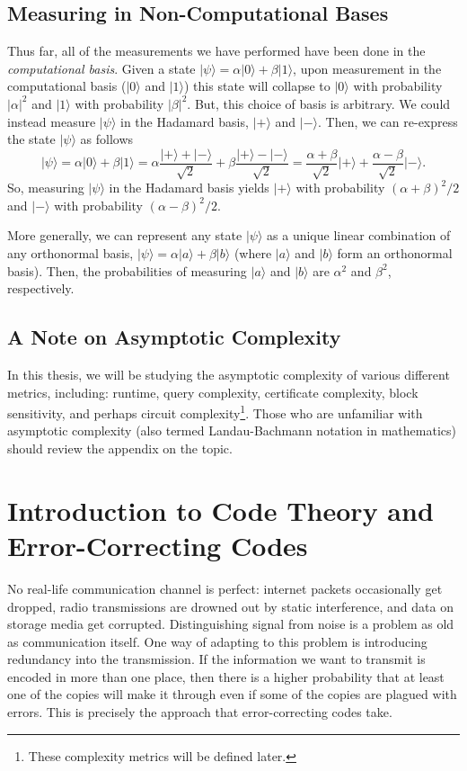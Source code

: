\documentclass[12pt,twoside]{reedthesis}
\theoremstyle{definition}
\newcommand{\ketz}{\ensuremath{\lvert 0\rangle}\xspace}
\newcommand{\keto}{\ensuremath{\lvert 1\rangle}\xspace}
\newcommand{\ket}[1]{\ensuremath{\lvert #1\rangle}\xspace}
\newcommand{\Hplus}{\ensuremath{\lvert + \rangle}\xspace}
\newcommand{\Hminus}{\ensuremath{\lvert- \rangle}\xspace}
\begin{document}
\section{Measuring in Non-Computational Bases}
Thus far, all of the measurements we have performed have been done in the \textit{computational basis}. Given a state $\ket{\psi} = \alpha\ketz + \beta\keto$, upon measurement in the computational basis ($\ketz$ and $\keto$) this state will collapse to $\ketz$ with probability $\lvert \alpha \rvert^2$ and $\keto$ with probability  $\lvert \beta \rvert^2.$ But, this choice of basis is arbitrary. We could instead measure $\ket{\psi}$ in the Hadamard basis, $\Hplus$ and $\Hminus$. Then, we can re-express the state $\ket{\psi}$ as follows
\begin{equation*}
\ket{\psi} = \alpha\ketz + \beta\keto = \alpha \frac{\Hplus + \Hminus}{\sqrt{2}} + \beta \frac{\Hplus - \Hminus}{\sqrt{2}} = \frac{\alpha + \beta}{\sqrt{2}} \Hplus + \frac{\alpha - \beta}{\sqrt{2}} \Hminus.
\end{equation*}
So, measuring $\ket{\psi}$ in the Hadamard basis yields $\Hplus$ with probability $(\alpha + \beta)^2/2$ and $\Hminus$ with probability $(\alpha - \beta)^2/2$.

More generally, we can represent any state $\ket{\psi}$ as a unique linear combination of any orthonormal basis, $\ket{\psi} = \alpha \ket{a}+ \beta \ket{b}$ (where $\ket{a}$ and $\ket{b}$ form an orthonormal basis). Then, the probabilities of measuring $\ket{a}$ and $\ket{b}$ are $\alpha^2$ and $\beta^2$, respectively.

\section{A Note on Asymptotic Complexity}

In this thesis, we will be studying the asymptotic complexity of various different metrics, including: runtime, query complexity, certificate complexity, block sensitivity, and perhaps circuit complexity\footnote{These complexity metrics will be defined later.}. Those who are unfamiliar with asymptotic complexity (also termed Landau-Bachmann notation in mathematics) should review the appendix on the topic. 


\chapter{Introduction to Code Theory and Error-Correcting Codes}	

No real-life communication channel is perfect: internet packets occasionally get dropped, radio transmissions are drowned out by static interference, and data on storage media get corrupted. Distinguishing signal from noise is a problem as old as communication itself. One way of adapting to this problem is introducing redundancy into the transmission. If the information we want to transmit is encoded in more than one place, then there is a higher probability that at least one of the copies will make it through even if some of the copies are plagued with errors. This is precisely the approach that error-correcting codes take. 
\end{document}
